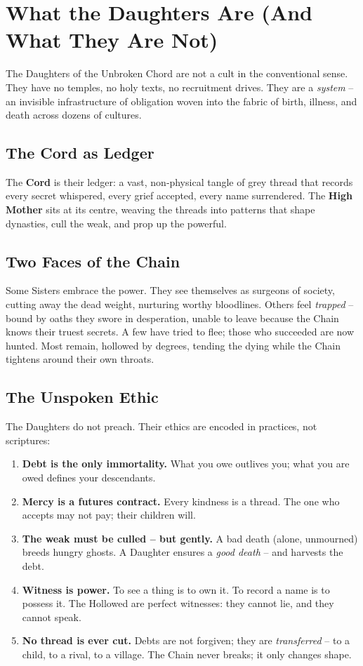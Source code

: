 \documentclass[10pt,twoside]{book}
\begin{document}
\tableofcontents
\newpage

\chapter{What the Daughters Are (And What They Are Not)}

The Daughters of the Unbroken Chord are not a cult in the conventional sense. They have no temples, no holy texts, no recruitment drives. They are a \emph{system} – an invisible infrastructure of obligation woven into the fabric of birth, illness, and death across dozens of cultures.

\section{The Cord as Ledger}
The \textbf{Cord} is their ledger: a vast, non‑physical tangle of grey thread that records every secret whispered, every grief accepted, every name surrendered. The \textbf{High Mother} sits at its centre, weaving the threads into patterns that shape dynasties, cull the weak, and prop up the powerful.

\section{Two Faces of the Chain}
Some Sisters embrace the power. They see themselves as surgeons of society, cutting away the dead weight, nurturing worthy bloodlines.
Others feel \emph{trapped} – bound by oaths they swore in desperation, unable to leave because the Chain knows their truest secrets.
A few have tried to flee; those who succeeded are now hunted. Most remain, hollowed by degrees, tending the dying while the Chain tightens around their own throats.

\section{The Unspoken Ethic}
The Daughters do not preach. Their ethics are encoded in practices, not scriptures:
\begin{enumerate}[label=\arabic*.]
\item \textbf{Debt is the only immortality.} What you owe outlives you; what you are owed defines your descendants.
\item \textbf{Mercy is a futures contract.} Every kindness is a thread. The one who accepts may not pay; their children will.
\item \textbf{The weak must be culled – but gently.} A bad death (alone, unmourned) breeds hungry ghosts. A Daughter ensures a \emph{good death} – and harvests the debt.
\item \textbf{Witness is power.} To see a thing is to own it. To record a name is to possess it. The Hollowed are perfect witnesses: they cannot lie, and they cannot speak.
\item \textbf{No thread is ever cut.} Debts are not forgiven; they are \emph{transferred} – to a child, to a rival, to a village. The Chain never breaks; it only changes shape.
\end{enumerate}
\end{document}

